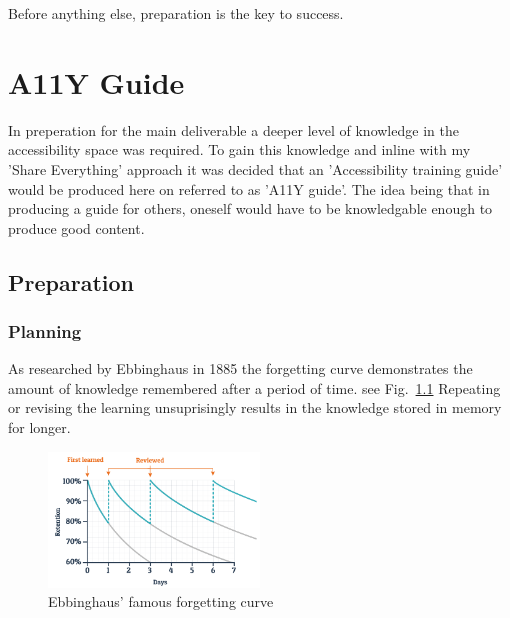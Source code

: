 \begin{savequote}[75mm]
Before anything else, preparation is the key to success.
\end{savequote}

\chapter{A11Y Guide}
In preperation for the main deliverable a deeper level of knowledge in the
accessibility space was required. To gain this knowledge and inline with my
'Share Everything' approach it was decided that an 'Accessibility
training guide' would be produced here on referred to as 'A11Y guide'. The idea
being that in producing a guide for others, oneself would have to be
knowledgable enough to produce good content.

\section{Preparation}
\subsection{Planning}

As researched by Ebbinghaus in 1885 the forgetting curve demonstrates the
amount of knowledge remembered after a period of time. see Fig.~\ref{fig:ebbinghaus}
Repeating or revising the learning unsuprisingly results in the knowledge
stored in memory for longer.

\begin{figure}[H]
\centering
\includegraphics[width=0.5\textwidth]{figures/ebbinghaus}
\captionsetup{justification=centering}
\caption[Short figure name.]{Ebbinghaus' famous forgetting curve
\label{fig:ebbinghaus}}
\end{figure}


